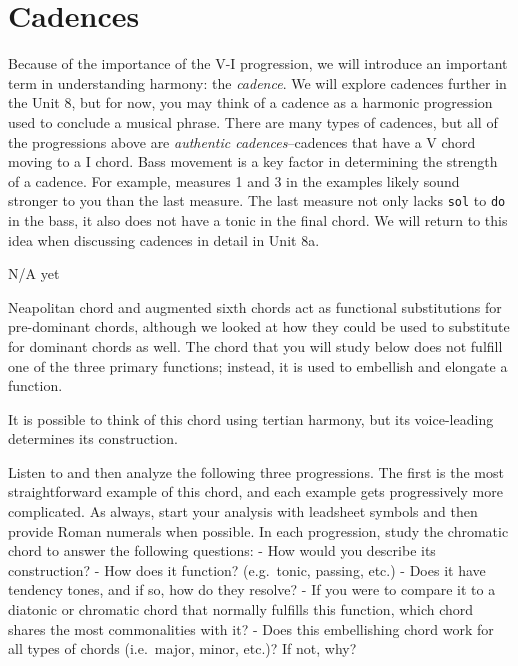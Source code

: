 \documentclass{book}
\begin{document}
\hypertarget{cadences-1}{%
\section{Cadences}\label{cadences-1}}

Because of the importance of the V-I progression, we will introduce an
important term in understanding harmony: the \emph{cadence}. We will explore
cadences further in the Unit 8, but for now, you may think of a cadence as a
harmonic progression used to conclude a musical phrase. There are many types
of cadences, but all of the progressions above are \emph{authentic
cadences}--cadences that have a V chord moving to a I chord. Bass movement is
a key factor in determining the strength of a cadence. For example, measures 1
and 3 in the examples likely sound stronger to you than the last measure. The
last measure not only lacks \texttt{sol} to \texttt{do} in the bass, it also
does not have a tonic in the final chord. We will return to this idea when
discussing cadences in detail in Unit 8a.

N/A yet

Neapolitan chord and augmented sixth chords act as functional substitutions
for pre-dominant chords, although we looked at how they could be used to
substitute for dominant chords as well. The chord that you will study below
does not fulfill one of the three primary functions; instead, it is used to
embellish and elongate a function.

It is possible to think of this chord using tertian harmony, but its
voice-leading determines its construction.

Listen to and then analyze the following three progressions. The first is the
most straightforward example of this chord, and each example gets
progressively more complicated. As always, start your analysis with leadsheet
symbols and then provide Roman numerals when possible. In each progression,
study the chromatic chord to answer the following questions: - How would you
describe its construction? - How does it function? (e.g.~tonic, passing, etc.)
- Does it have tendency tones, and if so, how do they resolve? - If you were
to compare it to a diatonic or chromatic chord that normally fulfills this
function, which chord shares the most commonalities with it? - Does this
embellishing chord work for all types of chords (i.e.~major, minor, etc.)? If
not, why?
\end{document}
